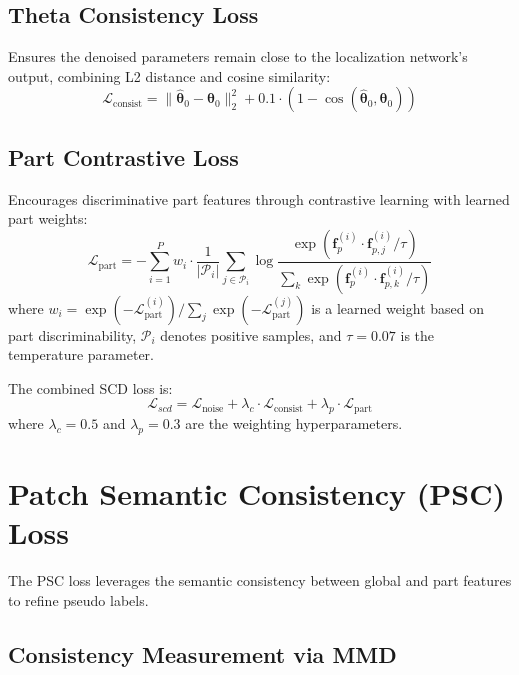 \subsection{Theta Consistency Loss}

Ensures the denoised parameters remain close to the localization network's output, combining L2 distance and cosine similarity:
\begin{equation}
    \mathcal{L}_{\text{consist}} = \|\hat{\boldsymbol{\theta}}_0 - \boldsymbol{\theta}_0\|_2^2 + 0.1 \cdot \left(1 - \cos(\hat{\boldsymbol{\theta}}_0, \boldsymbol{\theta}_0)\right)
\end{equation}

\subsection{Part Contrastive Loss}

Encourages discriminative part features through contrastive learning with learned part weights:
\begin{equation}
    \mathcal{L}_{\text{part}} = -\sum_{i=1}^{P} w_i \cdot \frac{1}{|\mathcal{P}_i|} \sum_{j \in \mathcal{P}_i} \log \frac{\exp(\mathbf{f}_p^{(i)} \cdot \mathbf{f}_{p,j}^{(i)} / \tau)}{\sum_k \exp(\mathbf{f}_p^{(i)} \cdot \mathbf{f}_{p,k}^{(i)} / \tau)}
\end{equation}
where $w_i = \exp(-\mathcal{L}_{\text{part}}^{(i)}) / \sum_j \exp(-\mathcal{L}_{\text{part}}^{(j)})$ is a learned weight based on part discriminability, $\mathcal{P}_i$ denotes positive samples, and $\tau = 0.07$ is the temperature parameter.

The combined SCD loss is:
\begin{equation}
    \mathcal{L}_{scd} = \mathcal{L}_{\text{noise}} + \lambda_c \cdot \mathcal{L}_{\text{consist}} + \lambda_p \cdot \mathcal{L}_{\text{part}}
\end{equation}
where $\lambda_c = 0.5$ and $\lambda_p = 0.3$ are the weighting hyperparameters.

\section{Patch Semantic Consistency (PSC) Loss}

The PSC loss leverages the semantic consistency between global and part features to refine pseudo labels.

\subsection{Consistency Measurement via MMD}

